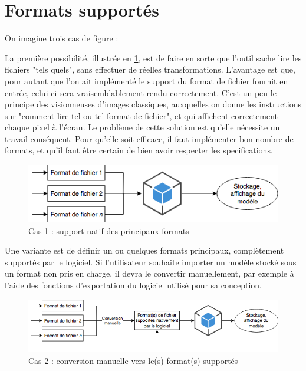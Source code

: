 \section{Formats supportés}

On imagine trois cas de figure :

La première possibilité, illustrée en \ref{fig:file-importation-process-native}, est de faire en sorte que l'outil sache lire les fichiers "tels quels", sans effectuer de réelles transformations.
L'avantage est que, pour autant que l'on ait implémenté le support du format de fichier fournit en entrée, celui-ci sera vraisemblablement rendu correctement. C'est un peu le principe des visionneuses d'images classiques, auxquelles on donne les instructions sur "comment lire tel ou tel format de fichier", et qui affichent correctement chaque pixel à l'écran.
Le problème de cette solution est qu'elle nécessite un travail conséquent. Pour qu'elle soit efficace, il faut implémenter bon nombre de formats, et qu'il faut être certain de bien avoir respecter les specifications.

\begin{figure}
    \centering
    \includegraphics[width=\linewidth]{Figures/file-importation-process-native.png}
    \caption{Cas 1 : support natif des principaux formats}
    \label{fig:file-importation-process-native}
\end{figure}

Une variante est de définir un ou quelques formats principaux, complètement supportés par le logiciel. Si l'utilisateur souhaite importer un modèle stocké sous un format non pris en charge, il devra le convertir manuellement, par exemple à l'aide des fonctions d'exportation du logiciel utilisé pour sa conception.

\begin{figure}
    \centering
    \includegraphics[width=\linewidth]{Figures/file-importation-process-manual-conversion.png}
    \caption{Cas 2 : conversion manuelle vers le(s) format(s) supportés}
    \label{fig:file-importation-process-manual-conversion}
\end{figure}

